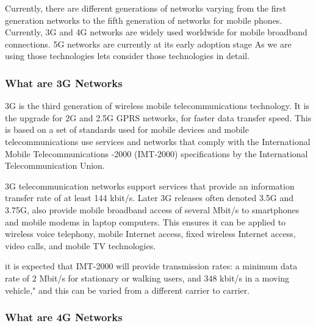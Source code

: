 \vspace{12pt}
Currently, there are different generations of networks varying from the first generation networks to the fifth generation of networks for mobile phones. Currently, 3G and 4G networks are widely used worldwide for mobile broadband connections. 5G networks are currently at its early adoption stage  As we are using those technologies lets consider those technologies in detail.
\vspace{12pt}

\subsubsection{What are 3G Networks}
\vspace{12pt}

3G is the third generation of wireless mobile telecommunications technology. It is the upgrade for 2G and 2.5G GPRS networks, for faster data transfer speed. This is based on a set of standards used for mobile devices and mobile telecommunications use services and networks that comply with the International Mobile Telecommunications -2000 (IMT-2000) specifications by the International Telecommunication Union.

\vspace{12pt}
3G telecommunication networks support services that provide an information transfer rate of at least 144 kbit/s.\cite{d_speed} Later 3G releases often denoted 3.5G and 3.75G, also provide mobile broadband access of several Mbit/s to smartphones and mobile modems in laptop computers. This ensures it can be applied to wireless voice telephony, mobile Internet access, fixed wireless Internet access, video calls, and mobile TV technologies.


\vspace{12pt}
it is expected that IMT-2000 will provide transmission rates: a minimum data rate of 2 Mbit/s for stationary or walking users, and 348 kbit/s in a moving vehicle," and this can be varied from a different carrier to carrier. \cite{about_mobi}





\vspace{12pt}

\subsubsection{What are 4G Networks}
\vspace{12pt}

